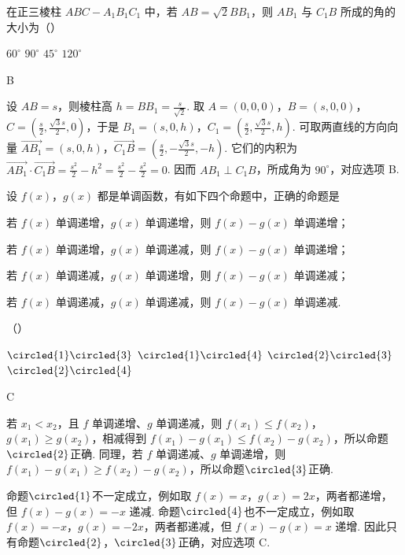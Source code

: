 \begin{problem}
在正三棱柱 \(ABC - A_{1}B_{1}C_{1}\) 中，若 \(AB = \sqrt{2} BB_{1}\)，则 \(AB_{1}\) 与 \(C_{1}B\) 所成的角的大小为（\quad）

\choices
    {\(60^{\circ}\)}
    {\(90^{\circ}\)}
    {\(45^{\circ}\)}
    {\(120^{\circ}\)}
\end{problem}

\begin{answer}
B
\end{answer}

\begin{solution}
设 \(AB=s\)，则棱柱高 \(h=BB_1=\frac{s}{\sqrt{2}}\). 取
\(A=(0,0,0)\)，\(B=(s,0,0)\)，\(C=\left(\frac{s}{2},\frac{\sqrt{3}s}{2},0\right)\)，于是
\(B_1=(s,0,h)\)，\(C_1=\left(\frac{s}{2},\frac{\sqrt{3}s}{2},h\right)\). 可取两直线的方向向量
\(\overrightarrow{AB_1}=(s,0,h)\)，\(\overrightarrow{C_1B}=\left(\frac{s}{2},-\frac{\sqrt{3}s}{2},-h\right)\). 它们的内积为
\(\overrightarrow{AB_1}\cdot\overrightarrow{C_1B}=\frac{s^2}{2}-h^2=\frac{s^2}{2}-\frac{s^2}{2}=0\). 因而 \(AB_1\perp C_1B\)，所成角为 \(90^{\circ}\)，对应选项 B.
\end{solution}

\begin{problem}
设 \(f(x)\)，\(g(x)\) 都是单调函数，有如下四个命题中，正确的命题是

\begin{circlelist}
\item 若 \(f(x)\) 单调递增，\(g(x)\) 单调递增，则 \(f(x) - g(x)\) 单调递增；
\item 若 \(f(x)\) 单调递增，\(g(x)\) 单调递减，则 \(f(x) - g(x)\) 单调递增；
\item 若 \(f(x)\) 单调递减，\(g(x)\) 单调递增，则 \(f(x) - g(x)\) 单调递减；
\item 若 \(f(x)\) 单调递减，\(g(x)\) 单调递减，则 \(f(x) - g(x)\) 单调递减.
\end{circlelist}

（\quad）

\choices
    {\(\circled{1}\circled{3}\)}
    {\(\circled{1}\circled{4}\)}
    {\(\circled{2}\circled{3}\)}
    {\(\circled{2}\circled{4}\)}
\end{problem}

\begin{answer}
C
\end{answer}

\begin{solution}
若 \(x_1<x_2\)，且 \(f\) 单调递增、\(g\) 单调递减，则 \(f(x_1)\leqslant f(x_2)\)，\(g(x_1)\geqslant g(x_2)\)，相减得到
\(f(x_1)-g(x_1)\leqslant f(x_2)-g(x_2)\)，所以命题\(\circled{2}\)正确. 同理，若 \(f\) 单调递减、\(g\) 单调递增，则
\(f(x_1)-g(x_1)\geqslant f(x_2)-g(x_2)\)，所以命题\(\circled{3}\)正确.

命题\(\circled{1}\)不一定成立，例如取 \(f(x)=x\)，\(g(x)=2x\)，两者都递增，但 \(f(x)-g(x)=-x\) 递减. 命题\(\circled{4}\)也不一定成立，例如取 \(f(x)=-x\)，\(g(x)=-2x\)，两者都递减，但 \(f(x)-g(x)=x\) 递增. 因此只有命题\(\circled{2}\)，\(\circled{3}\)正确，对应选项 C.
\end{solution}

